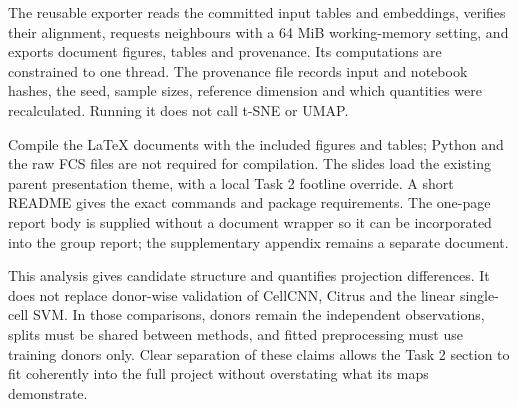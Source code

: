 \documentclass[11pt]{article}
\begin{document}
The reusable exporter reads the committed input tables and embeddings, verifies their alignment, requests neighbours with a 64 MiB working-memory setting, and exports document figures, tables and provenance. Its computations are constrained to one thread. The provenance file records input and notebook hashes, the seed, sample sizes, reference dimension and which quantities were recalculated. Running it does not call t-SNE or UMAP.

Compile the LaTeX documents with the included figures and tables; Python and the raw FCS files are not required for compilation. The slides load the existing parent presentation theme, with a local Task 2 footline override. A short README gives the exact commands and package requirements. The one-page report body is supplied without a document wrapper so it can be incorporated into the group report; the supplementary appendix remains a separate document.

This analysis gives candidate structure and quantifies projection differences. It does not replace donor-wise validation of CellCNN, Citrus and the linear single-cell SVM. In those comparisons, donors remain the independent observations, splits must be shared between methods, and fitted preprocessing must use training donors only. Clear separation of these claims allows the Task 2 section to fit coherently into the full project without overstating what its maps demonstrate.

\clearpage
\end{document}
